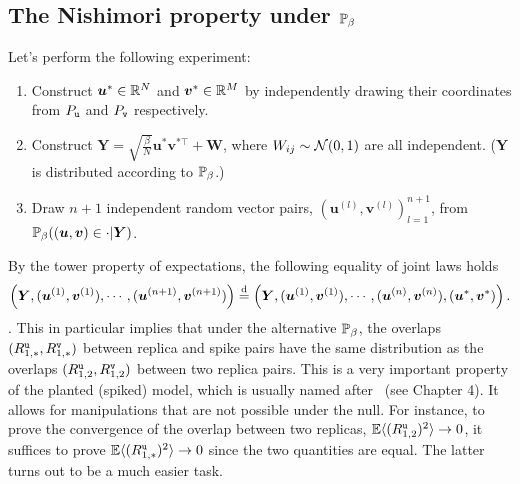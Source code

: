 \documentclass[final,12pt]{colt2018} %
\renewcommand{\intercal}{{\bm \top}}
\newcommand{\utt}{\textup{\texttt{u}}}
\newcommand{\vtt}{\textup{\texttt{v}}}
\renewcommand{\u}{\bm{u}}
\renewcommand{\v}{\bm{v}}
\newcommand{\Y}{\bm{Y}}
\newcommand{\W}{\bm{W}}
\begin{document}
\subsection{The Nishimori property under $\P_{\beta}$} 
Let's perform the following experiment:
\begin{enumerate}
\item Construct $\u^*\in \R^N$ and $\v^*\in \R^M$ by independently drawing their coordinates from $P_{\utt}$ and $P_{\vtt}$ respectively.
\item Construct $\Y = \sqrt{\frac{\beta}{N}}\u^*\v^{*\intercal} + \W$, where $W_{ij} \sim \normal(0,1)$ are all independent. ($\Y$ is distributed according to $\P_{\beta}$.)
\item Draw $n+1$ independent random vector pairs, $(\u^{(l)},\v^{(l)})_{l=1}^{n+1}$, from $\P_{\beta}((\u,\v) \in \cdot |\Y)$.
\end{enumerate}
By the tower property of expectations, the following equality of joint laws holds  
\begin{equation}\label{nishimori_property}
\left(\Y,(\u^{(1)},\v^{(1)}),\cdots,(\u^{(n+1)},\v^{(n+1)})\right) \overset{\textup{d}}{=}  \left(\Y,(\u^{(1)},\v^{(1)}),\cdots,(\u^{(n)},\v^{(n)}),(\u^{*},\v^{*})\right).
\end{equation}
\citep[See Proposition 15 in][]{lelarge2016fundamental_colt}. This in particular implies that under the alternative $\P_{\beta}$, the overlaps $(R^{\utt}_{1,*},R^{\vtt}_{1,*})$ between replica and spike pairs have the same distribution as the overlaps $(R^{\utt}_{1,2},R^{\vtt}_{1,2})$ between two replica pairs. This is a very important property of the planted (spiked) model, which is usually named after~\cite{nishimori2001statistical} (see Chapter 4). It allows for manipulations that are not possible under the null. For instance, to prove the convergence of the overlap between two replicas, $\E\langle (R^{\utt}_{1,2})^2\rangle  \to 0$, it suffices to prove $\E\langle (R^{\utt}_{1,*})^2\rangle  \to 0$ since the two quantities are equal. The latter turns out to be a much easier task. 
\end{document}
